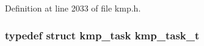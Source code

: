 Definition at line 2033 of file kmp.\-h.

\hypertarget{group__BASIC__TYPES_ga2783514e154e897944132a3ba6ed8789}{
\subsubsection[{kmp\-\_\-task\-\_\-t}]{\setlength{\rightskip}{0pt plus 5cm}typedef struct {\bf kmp\-\_\-task}  {\bf kmp\-\_\-task\-\_\-t}}}\label{group__BASIC__TYPES_ga2783514e154e897944132a3ba6ed8789}
